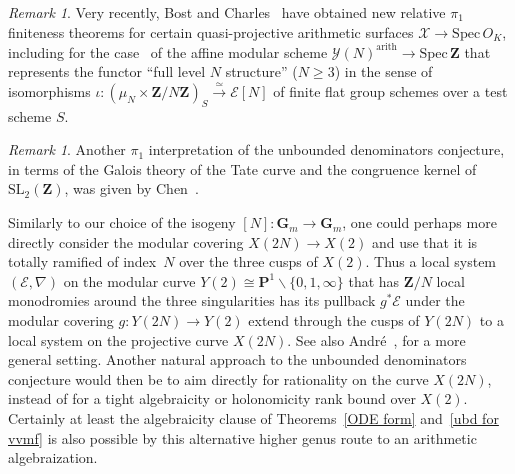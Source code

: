 \documentclass[10pt]{amsart}
\def\SSS{\S}
\renewcommand\setminus{\smallsetminus}
\def\spec{\mathrm{Spec} \,}
\def\Z{\mathbf{Z}}
\renewcommand\mathbb{\mathbf}
\theoremstyle{remark}
\newtheorem{remark}[subsubsection]{Remark}
\numberwithin{equation}{subsection}
\def\SL{\mathrm{SL}}
\begin{document}
\begin{remark}
Very recently, Bost and Charles~\cite{BostCharles} have obtained new relative $\pi_1$ finiteness theorems for certain quasi-projective
arithmetic surfaces  $\mathcal{X} \to \spec{O_K}$, including for the case~\cite[\SSS~9.3.4]{BostCharles} of the affine modular scheme $\mathcal{Y}(N)^{\mathrm{arith}} \to  \spec \Z$ that represents the functor ``full level $N$ structure'' ($N \geq 3$) in the sense of isomorphisms $\iota : ( \mu_N \times \Z / N\Z )_S \stackrel{\simeq}{\longrightarrow} \mathcal{E}[N]$ of finite flat group schemes over a test scheme $S$. 
\end{remark}

\begin{remark}
Another $\pi_1$ interpretation of the unbounded denominators conjecture, in terms of the Galois theory of the Tate curve and the congruence kernel of
$\SL_2(\Z)$, was given by Chen~\cite[Conjecture~5.5.10]{Chen}.
\end{remark}

Similarly to our choice of the isogeny $[N] : \mathbb{G}_m \to \mathbb{G}_m$, one could perhaps more directly consider the modular covering $X(2N) \to X(2)$ and use that it is totally ramified of index~$N$ over the three cusps of $X(2)$. Thus a local system $(\mathcal{E},\nabla)$ on the modular curve $Y(2) \cong \mathbb{P}^1 \setminus \{0,1,\infty\}$ that has  $\Z/N$ local monodromies around the three singularities  has its pullback $g^*\mathcal{E}$ under the modular covering $g: Y(2N) \to Y(2)$ extend through the cusps of $Y(2N)$ to a local system on the projective curve $X(2N)$.  See also Andr\'e~\cite[II \SSS~8.3]{Andre}, for a more general setting. Another natural approach to the unbounded denominators conjecture 
would then be to aim directly for rationality on the curve $X(2N)$, instead of for a tight algebraicity or holonomicity rank bound over $X(2)$. Certainly at least the algebraicity clause of Theorems~\ref{ODE form} and~\ref{ubd for vvmf} is also possible by this alternative higher genus route to an arithmetic
algebraization. 
\end{document}
